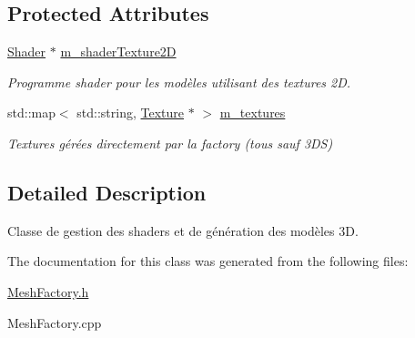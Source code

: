 \subsection*{Protected Attributes}
\begin{DoxyCompactItemize}
\item 
\hypertarget{classMeshFactory_a49c1212540dc91ab923efc1d02e305b9}{\hyperlink{classShader}{Shader} $\ast$ \hyperlink{classMeshFactory_a49c1212540dc91ab923efc1d02e305b9}{m\-\_\-shader\-Texture2\-D}}\label{classMeshFactory_a49c1212540dc91ab923efc1d02e305b9}

\begin{DoxyCompactList}\small\item\em Programme shader pour les modèles utilisant des textures 2\-D. \end{DoxyCompactList}\item 
\hypertarget{classMeshFactory_a68d434125dbe5a1c7a7772602d5e77fd}{std\-::map$<$ std\-::string, \hyperlink{classTexture}{Texture} $\ast$ $>$ \hyperlink{classMeshFactory_a68d434125dbe5a1c7a7772602d5e77fd}{m\-\_\-textures}}\label{classMeshFactory_a68d434125dbe5a1c7a7772602d5e77fd}

\begin{DoxyCompactList}\small\item\em Textures gérées directement par la factory (tous sauf 3\-D\-S) \end{DoxyCompactList}\end{DoxyCompactItemize}


\subsection{Detailed Description}
Classe de gestion des shaders et de génération des modèles 3\-D. 

The documentation for this class was generated from the following files\-:\begin{DoxyCompactItemize}
\item 
\hyperlink{MeshFactory_8h}{Mesh\-Factory.\-h}\item 
Mesh\-Factory.\-cpp\end{DoxyCompactItemize}

